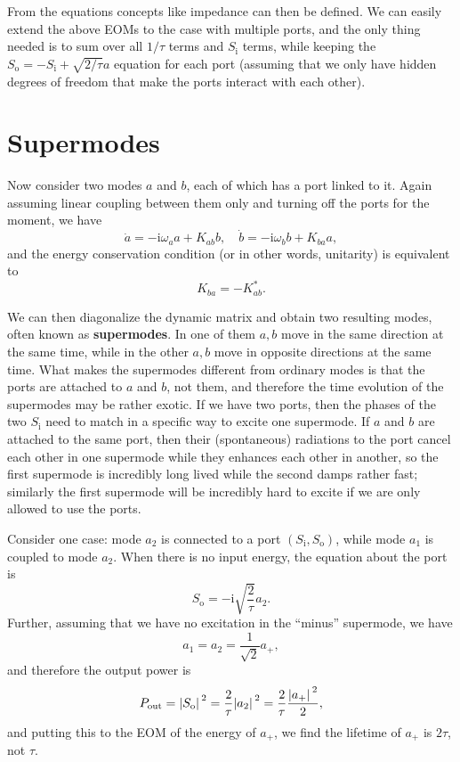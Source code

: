 \documentclass[hyperref, a4paper]{article}
\newcommand*{\ii}{\mathrm{i}}
\newcommand*{\concept}[1]{{\textbf{#1}}}
\newcommand*{\Si}{S_{\text{i}}}
\newcommand*{\So}{S_{\text{o}}}
\begin{document}
From the equations concepts like impedance can then be defined. 
We can easily extend the above EOMs to the case with multiple ports, 
and the only thing needed is to sum over all $1/\tau$ terms and $\Si$ terms, 
while keeping the $\So = - \Si + \sqrt{2/\tau} a$ equation for each port 
(assuming that we only have hidden degrees of freedom that make the ports interact with each other).

\section{Supermodes}

Now consider two modes $a$ and $b$, 
each of which has a port linked to it.
Again assuming linear coupling between them only and turning off the ports for the moment, we have 
\begin{equation}
    \dot{a} = - \ii \omega_a a + K_{ab} b, \quad 
    \dot{b} = - \ii \omega_b b + K_{ba} a,
\end{equation}
and the energy conservation condition (or in other words, unitarity) is equivalent to
\begin{equation}
    K_{ba} = - K_{ab}^*.
\end{equation}

We can then diagonalize the dynamic matrix and obtain two resulting modes, 
often known as \concept{supermodes}.
In one of them $a, b$ move in the same direction at the same time, 
while in the other $a, b$ move in opposite directions at the same time.
What makes the supermodes different from ordinary modes is that 
the ports are attached to $a$ and $b$, not them, 
and therefore the time evolution of the supermodes may be rather exotic.
If we have two ports, then the phases of the two $\Si$ need to match in a specific way 
to excite one supermode. 
If $a$ and $b$ are attached to the same port, 
then their (spontaneous) radiations to the port cancel each other in one supermode 
while they enhances each other in another, 
so the first supermode is incredibly long lived 
while the second damps rather fast; 
similarly the first supermode will be incredibly hard to excite 
if we are only allowed to use the ports.

Consider one case: mode $a_2$ is connected to a port $(\Si, \So)$,
while mode $a_1$ is coupled to mode $a_2$.
When there is no input energy, the equation about the port is 
\begin{equation}
    \So = - \ii \sqrt{\frac{2}{\tau}} a_2.
\end{equation}
Further, assuming that we have no excitation in the ``minus'' supermode, we have 
\begin{equation}
    a_1 = a_2 = \frac{1}{\sqrt{2}} a_+, 
\end{equation}
and therefore the output power is  
\begin{equation}
    P_{\text{out}} = \abs*{\So}^2 = \frac{2}{\tau} \abs*{a_2}^2
    = \frac{2}{\tau} \frac{\abs*{a_+}^2}{2} ,
\end{equation}
and putting this to the EOM of the energy of $a_+$, 
we find the lifetime of $a_+$ is $2 \tau$, not $\tau$.
\end{document}
